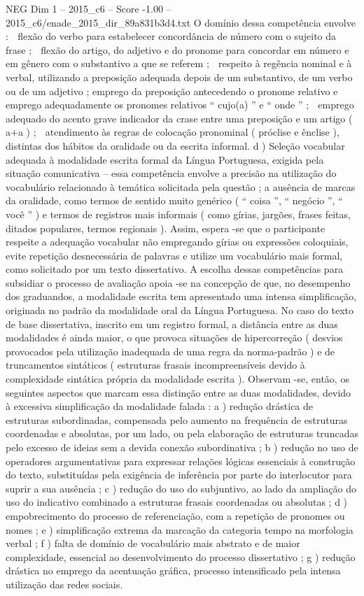 \begin{textsample}{NEG Dim 1 – 2015\_c6 – Score -1.00 – 2015\_c6/enade\_2015\_dir\_89a831b3d4.txt}
O domínio dessa competência envolve :  flexão do verbo para estabelecer concordância de número com o sujeito da frase ;  flexão do artigo, do adjetivo e do pronome para concordar em número e em gênero com o substantivo a que se referem ;  respeito à regência nominal e à verbal, utilizando a preposição adequada depois de um substantivo, de um verbo ou de um adjetivo ; emprego da preposição antecedendo o pronome relativo e emprego adequadamente os pronomes relativos “ cujo(a) ” e “ onde ” ;  emprego adequado do acento grave indicador da crase entre uma preposição e um artigo ( a+a ) ;  atendimento às regras de colocação pronominal ( próclise e ênclise ), distintas dos hábitos da oralidade ou da escrita informal. d ) Seleção vocabular adequada à modalidade escrita formal da Língua Portuguesa, exigida pela situação comunicativa – essa competência envolve a precisão na utilização do vocabulário relacionado à temática solicitada pela questão ; a ausência de marcas da oralidade, como termos de sentido muito genérico ( “ coisa ”, “ negócio ”, “ você ” ) e termos de registros mais informais ( como gírias, jargões, frases feitas, ditados populares, termos regionais ).
Assim, espera -se que o participante respeite a adequação vocabular não empregando gírias ou expressões coloquiais, evite repetição desnecessária de palavras e utilize um vocabulário mais formal, como solicitado por um texto dissertativo.
A escolha dessas competências para subsidiar o processo de avaliação apoia -se na concepção de que, no desempenho dos graduandos, a modalidade escrita tem apresentado uma intensa simplificação, originada no padrão da modalidade oral da Língua Portuguesa.
No caso do texto de base dissertativa, inscrito em um registro formal, a distância entre as duas modalidades é ainda maior, o que provoca situações de hipercorreção ( desvios provocados pela utilização inadequada de uma regra da norma-padrão ) e de truncamentos sintáticos ( estruturas frasais incompreensíveis devido à complexidade sintática própria da modalidade escrita ).
Observam -se, então, os seguintes aspectos que marcam essa distinção entre as duas modalidades, devido à excessiva simplificação da modalidade falada : a ) redução drástica de estruturas subordinadas, compensada pelo aumento na frequência de estruturas coordenadas e absolutas, por um lado, ou pela elaboração de estruturas truncadas pelo excesso de ideias sem a devida conexão subordinativa ; b ) redução no uso de operadores argumentativas para expressar relações lógicas essenciais à construção do texto, substituídas pela exigência de inferência por parte do interlocutor para suprir a sua ausência ; c ) redução do uso do subjuntivo, ao lado da ampliação do uso do indicativo combinado a estruturas frasais coordenadas ou absolutas ; d ) empobrecimento do processo de referenciação, com a repetição de pronomes ou nomes ; e ) simplificação extrema da marcação da categoria tempo na morfologia verbal ; f ) falta de domínio de vocabulário mais abstrato e de maior complexidade, essencial ao desenvolvimento do processo dissertativo ; g ) redução drástica no emprego da acentuação gráfica, processo intensificado pela intensa utilização das redes sociais.

\end{textsample}

